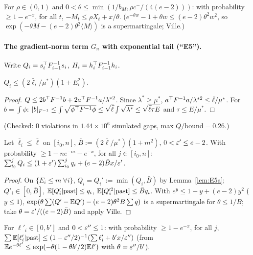 \begin{lemma}\label{lem:E4}\Pt{}
For $\rho\in(0,1)$ and $0<\theta\le\min(1/b_M,\rho c^-/(4(e-2)))$: with probability $\ge1-e^{-x}$, for all $t$, $-M_t\le\rho X_t+x/\theta$. ($e^{-\theta w}-1+\theta w\le(e-2)\theta^2w^2$, so $\exp(-\theta M-(e-2)\theta^2\langle M\rangle)$ is a supermartingale; Ville.)
\end{lemma}

\paragraph{The gradient-norm term $G_n$ with exponential tail (``E5'').}
Write $Q_i=s_i^{\top} F_{i-1}^{-1}s_i$, $H_i=h_i^{\top} F_{i-1}^{-1}h_i$.

\begin{lemma}\label{lem:E5a}\Pt{}
$Q_i\le(2\bar\ell_i/\mu^*)(1+E_i^2)$.
\end{lemma}
\begin{proof}
$Q\le2b^{\top} F^{-1}b+2a^{\top} F^{-1}a/\lambda^{*2}$. Since $\lambda^*\ge\mu^*$, $a^{\top} F^{-1}a/\lambda^{*2}\le\bar\ell/\mu^*$. For $b=\int\phi$: $\lvert b\rvert_{F^{-1}}\le\int\sqrt{\phi^{\top} F^{-1}\phi}\le\sqrt{\bar\ell}\int\sqrt{\lambda^*}\le\sqrt{\bar\ell\tau E}$ and $\tau\le E/\mu^*$.
\end{proof}
(Checked: $0$ violations in $1.44\times10^6$ simulated gaps, max $Q/\text{bound}=0.26$.)

\begin{lemma}\label{lem:E5b}\Pt{}
Let $\bar\ell_i\le\bar\ell$ on $[i_0,n]$, $\bar B:=(2\bar\ell/\mu^*)(1+m^2)$, $0<\varepsilon'\le e-2$. With probability $\ge1-ne^{-m}-e^{-x}$, for all $j\in[i_0,n]$:
$\sum_{i_0}^jQ_i\le(1+\varepsilon')\sum_{i_0}^jq_i+(e-2)\bar Bx/\varepsilon'$.
\end{lemma}
\begin{proof}
On $\{E_i\le m\ \forall i\}$, $Q_i=Q_i':=\min(Q_i,\bar B)$ by Lemma~\ref{lem:E5a}; $Q'_i\in[0,\bar B]$, $\mathbb{E}[Q_i'|\text{past}]\le q_i$, $\mathbb{E}[Q_i'^2|\text{past}]\le\bar Bq_i$. With $e^y\le1+y+(e-2)y^2$ ($y\le1$), $\exp(\theta\sum(Q'-\mathbb{E} Q')-(e-2)\theta^2\bar B\sum q)$ is a supermartingale for $\theta\le1/\bar B$; take $\theta=\varepsilon'/((e-2)\bar B)$ and apply Ville.
\end{proof}

\begin{lemma}\label{lem:E5c}\Pt{}
For $\ell'_i\in[0,b']$ and $0<\varepsilon''\le1$: with probability $\ge1-e^{-x}$, for all $j$, $\sum\mathbb{E}[\ell'_i|\text{past}]\le(1-\varepsilon''/2)^{-1}(\sum\ell'_i+b'x/\varepsilon'')$ (from $\mathbb{E} e^{-\theta\ell'}\le\exp(-\theta(1-\theta b'/2)\mathbb{E}\ell')$ with $\theta=\varepsilon''/b'$).
\end{lemma}

